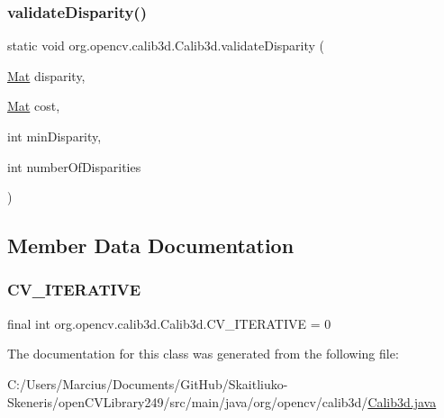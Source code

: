 \mbox{\label{classorg_1_1opencv_1_1calib3d_1_1_calib3d_aadd44bca728908e8afff768d760e3a83}} 
\subsubsection{\texorpdfstring{validate\+Disparity()}{validateDisparity()}\hspace{0.1cm}{\footnotesize\ttfamily [2/2]}}
{\footnotesize\ttfamily static void org.\+opencv.\+calib3d.\+Calib3d.\+validate\+Disparity (\begin{DoxyParamCaption}\item[{\mbox{\hyperlink{classorg_1_1opencv_1_1core_1_1_mat}{Mat}}}]{disparity,  }\item[{\mbox{\hyperlink{classorg_1_1opencv_1_1core_1_1_mat}{Mat}}}]{cost,  }\item[{int}]{min\+Disparity,  }\item[{int}]{number\+Of\+Disparities }\end{DoxyParamCaption})\hspace{0.3cm}{\ttfamily [static]}}



\subsection{Member Data Documentation}
\mbox{\label{classorg_1_1opencv_1_1calib3d_1_1_calib3d_a3f736627ca0cf3d33c043fc10a937081}} 
\subsubsection{\texorpdfstring{C\+V\+\_\+\+I\+T\+E\+R\+A\+T\+I\+VE}{CV\_ITERATIVE}}
{\footnotesize\ttfamily final int org.\+opencv.\+calib3d.\+Calib3d.\+C\+V\+\_\+\+I\+T\+E\+R\+A\+T\+I\+VE = 0\hspace{0.3cm}{\ttfamily [static]}}



The documentation for this class was generated from the following file\+:\begin{DoxyCompactItemize}
\item 
C\+:/\+Users/\+Marcius/\+Documents/\+Git\+Hub/\+Skaitliuko-\/\+Skeneris/open\+C\+V\+Library249/src/main/java/org/opencv/calib3d/\mbox{\hyperlink{_calib3d_8java}{Calib3d.\+java}}\end{DoxyCompactItemize}
